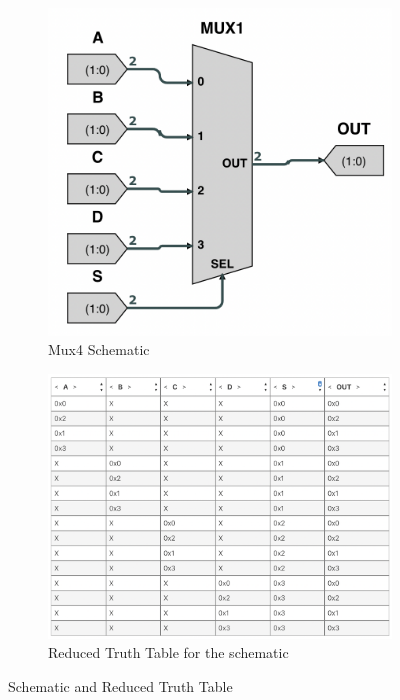 \begin{figure}
     \centering
     \begin{subfigure}[b]{0.45\textwidth}
         \centering
         \includegraphics[width=\textwidth]{05.ImpPlan/mux4.png}
         \caption{Mux4 Schematic}
         \label{fig:mux4schematic}
     \end{subfigure}
     \begin{subfigure}[b]{0.45\textwidth}
         \centering
         \includegraphics[width=\textwidth]{05.ImpPlan/mux4table.png}
         \caption{Reduced Truth Table for the schematic}
         \label{fig:mux4table}
     \end{subfigure}
        \caption{Schematic and Reduced Truth Table}
        \label{fig:mux4}
\end{figure}


